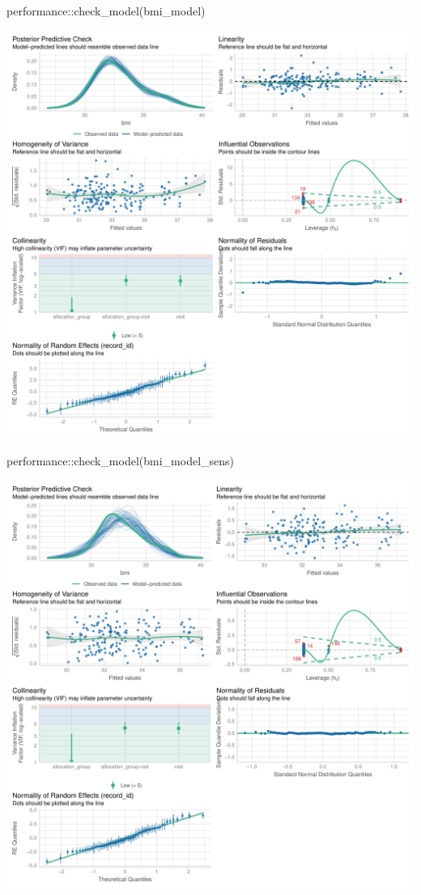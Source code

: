 \documentclass[
  12pt,
]{article}
\newenvironment{Shaded}{\begin{snugshade}}{\end{snugshade}}
\newcommand{\FunctionTok}[1]{\textcolor[rgb]{0.28,0.35,0.67}{#1}}
\newcommand{\NormalTok}[1]{\textcolor[rgb]{0.00,0.23,0.31}{#1}}
\newcommand{\SpecialCharTok}[1]{\textcolor[rgb]{0.37,0.37,0.37}{#1}}
\begin{document}
\begin{Shaded}
\begin{Highlighting}[]
\NormalTok{performance}\SpecialCharTok{::}\FunctionTok{check\_model}\NormalTok{(bmi\_model)}
\end{Highlighting}
\end{Shaded}

\includegraphics{Outcomes_files/figure-pdf/bmi_4-1.pdf}

\begin{Shaded}
\begin{Highlighting}[]
\NormalTok{performance}\SpecialCharTok{::}\FunctionTok{check\_model}\NormalTok{(bmi\_model\_sens)}
\end{Highlighting}
\end{Shaded}

\includegraphics{Outcomes_files/figure-pdf/bmi_4-2.pdf}
\end{document}
